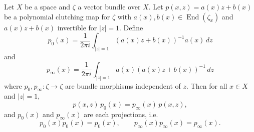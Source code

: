 Let $X$ be a space and $\zeta$ a vector bundle over $X$. Let $p(x,z) = a(x)z + b(x)$ be a polynomial clutching map for $\zeta$ with $a(x), b(x) \in \operatorname{End}(\zeta_x)$ and $a(x)z + b(x)$ invertible for $|z| = 1$. Define
$$
p_0(x) = \frac{1}{2\pi i} \int_{|z|=1} (a(x)z + b(x))^{-1} a(x) \, dz
$$
and
$$
p_\infty(x) = \frac{1}{2\pi i} \int_{|z|=1} a(x)(a(x)z + b(x))^{-1} \, dz
$$
where $p_0, p_\infty: \zeta \to \zeta$ are bundle morphisms independent of $z$. Then for all $x \in X$ and $|z| = 1$,
$$
p(x,z) \, p_0(x) = p_\infty(x) \, p(x,z),
$$
and $p_0(x)$ and $p_\infty(x)$ are each projections, i.e.
$$
p_0(x) p_0(x) = p_0(x), \qquad p_\infty(x) p_\infty(x) = p_\infty(x).
$$
